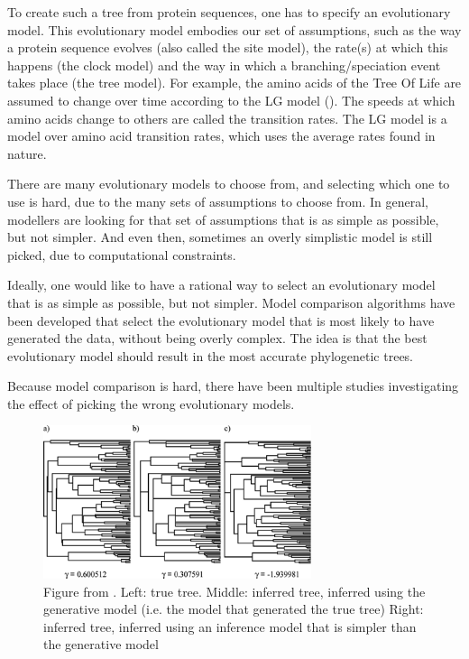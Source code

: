 To create such a tree from protein sequences, one has to specify
an evolutionary model. This evolutionary model embodies our set of
assumptions,
such as the way a protein sequence evolves (also called the site model), 
the rate(s) at which this happens (the clock model) 
and the way in which a branching/speciation event takes 
place (the tree model). 
For example, the amino acids of the Tree Of Life are assumed to change
over time according to the LG model (\cite{le2008improved}).
The speeds at which amino acids change to others are called the transition
rates. The LG model is a model over amino acid transition rates, 
which uses the average rates found in nature.

There are many evolutionary models to choose from, 
and selecting which one to use is hard, due to the many sets of assumptions
to choose from. In general, modellers are looking for that set of assumptions
that is as simple as possible, but not simpler. And even then, sometimes
an overly simplistic model is still picked, due to computational 
constraints. 

Ideally, one would like to have a rational way to select 
an evolutionary model that is as simple as possible, but not simpler.
Model comparison algorithms have been developed that select the evolutionary model that is
most likely to have generated the data, without being overly complex.
The idea is that the best evolutionary model should result in the
most accurate phylogenetic trees.

Because model comparison is hard, there have been multiple
studies investigating the effect of picking the wrong
evolutionary models. 

\begin{figure}[H]
  \includegraphics[width=0.7\textwidth]{revell2005under.png}
  \caption{
    Figure from \cite{revell2005under}. Left: true tree. Middle: inferred tree, inferred using the generative model (i.e. the model that generated the true tree)
    Right: inferred tree, inferred using an inference model that is simpler than the generative model
 }
  \label{fig:revell2005under}
\end{figure}

